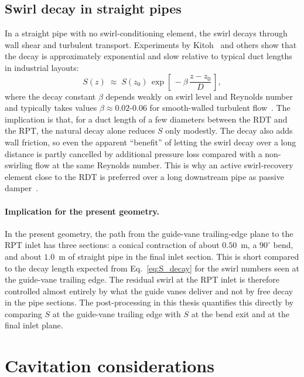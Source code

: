 \subsection{Swirl decay in straight pipes}
\label{sec:theory_swirl_decay}
 
In a straight pipe with no swirl-conditioning element, the swirl decays through wall shear and turbulent transport. Experiments by Kitoh~\cite{Kitoh1991} and others show that the decay is approximately exponential and slow relative to typical duct lengths in industrial layouts:
\begin{equation}
S(z) \;\approx\; S(z_0)\,\exp\!\left[\,-\beta\,\frac{z - z_0}{D}\,\right],
\label{eq:S_decay}
\end{equation}
where the decay constant $\beta$ depends weakly on swirl level and Reynolds number and typically takes values $\beta \approx 0.02$-$0.06$ for smooth-walled turbulent flow~\cite{Kitoh1991, Beaubert2016}. The implication is that, for a duct length of a few diameters between the RDT and the RPT, the natural decay alone reduces $S$ only modestly. The decay also adds wall friction, so even the apparent ``benefit'' of letting the swirl decay over a long distance is partly cancelled by additional pressure loss compared with a non-swirling flow at the same Reynolds number. This is why an active swirl-recovery element close to the RDT is preferred over a long downstream pipe as passive damper~\cite{Andersen2014, Nguyen2024}.
 
\paragraph{Implication for the present geometry.}
In the present geometry, the path from the guide-vane trailing-edge plane to the RPT inlet has three sections: a conical contraction of about $0.50$~m, a $90^\circ$ bend, and about $1.0$~m of straight pipe in the final inlet section. This is short compared to the decay length expected from Eq.~\ref{eq:S_decay} for the swirl numbers seen at the guide-vane trailing edge. The residual swirl at the RPT inlet is therefore controlled almost entirely by what the guide vanes deliver and not by free decay in the pipe sections. The post-processing in this thesis quantifies this directly by comparing $S$ at the guide-vane trailing edge with $S$ at the bend exit and at the final inlet plane.
 
\section{Cavitation considerations}
\label{sec:theory_cavitation}
 
